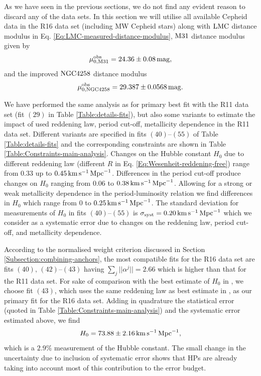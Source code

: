 As we have seen in the previous sections, we do not find any evident reason to discard any of the data sets. In this section we will utilise all available Cepheid data in the R16 data set (including MW Cepheid stars) along with $\mathrm{LMC}$ distance modulus in Eq. \eqref{Eq:LMC-measured-distance-modulus}, $\mathrm{M31}$ distance modulus \cite{Riess:2016jrr} given by 
\begin{equation}
\mu_{0,\mathrm{M31}}^{\mathrm{obs}} = 24.36 \pm 0.08\, \mathrm{mag},
\label{Eq:M31-measured-distance-modulus-2016}
\end{equation}
and the improved $\mathrm{NGC4258}$ distance modulus \cite{Riess:2016jrr}
\begin{equation}
\mu_{0,\mathrm{NGC4258}}^{\mathrm{obs}} = 29.387 \pm 0.0568\, \mathrm{mag}.
\label{Eq:NGC4258-measured-distance-modulus-2016}
\end{equation}

We have performed the same analysis as for primary best fit with the R11 data set (fit $(29)$ in Table \ref{Table:details-fits}), but also some variants to estimate the impact of used reddening law, period cut-off, metallicity dependence in the R11 data set. Different variants are specified in fits $(40)$--$(55)$ of Table \ref{Table:details-fits} and the corresponding constraints are shown in Table \ref{Table:Constraints-main-analysis}. Changes on the Hubble constant $H_0$ due to different reddening law (different $R$ in Eq. \eqref{Eq:Wesenheit-reddening-free}) range from $0.33$ up to $0.45\, \mathrm{km}\, \mathrm{s}^{-1}\, \mathrm{Mpc}^{-1}$. Differences in the period cut-off produce changes on $H_0$ ranging from $0.06$ to $0.38\, \mathrm{km}\, \mathrm{s}^{-1}\, \mathrm{Mpc}^{-1}$. Allowing for a strong or weak metallicity dependence in the period-luminosity relation we find differences in $H_0$ which range from $0$ to $0.25\, \mathrm{km}\, \mathrm{s}^{-1}\, \mathrm{Mpc}^{-1}$. The standard deviation for measurements of $H_0$ in fits $(40)$--$(55)$ is $\sigma_{\mathrm{syst}}=0.20\, \mathrm{km}\, \mathrm{s}^{-1}\, \mathrm{Mpc}^{-1} $ which we consider as a systematic error due to changes on the reddening law, period cut-off, and metallicity dependence.

According to the normalised weight criterion discussed in Section \ref{Subsection:combining-anchors}, the most compatible fits for the R16 data set are fits $(40),\, (42)$--$(43)$ having $\sum_j || \alpha^{j}||=2.66$ which is higher than that for the R11 data set. For sake of comparison with the best estimate of $H_0$ in \cite{Riess:2016jrr}, we choose fit $(43)$, which uses the same reddening law as best estimate in \cite{Riess:2016jrr}, as our primary fit for the R16 data set. Adding in quadrature the statistical error (quoted in Table \ref{Table:Constraints-main-analysis}) and the systematic error estimated above, we find 
\begin{equation}
H_0 = 73.88 \pm 2.16\,\mathrm{km}\, \mathrm{s}^{-1}\, \mathrm{Mpc}^{-1},
\label{Eq:primary-best-fit-R16}
\end{equation}        
which is a $2.9\%$ measurement of the Hubble constant. The small change in the uncertainty due to inclusion of systematic error shows that HPs are already taking into account most of this contribution to the error budget. 

